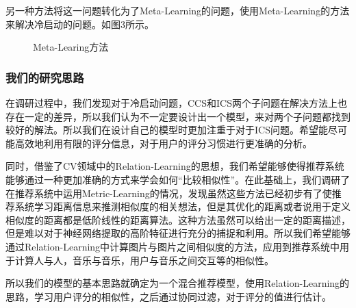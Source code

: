 另一种方法将这一问题转化为了Meta-Learning的问题，使用Meta-Learning的方法来解决冷启动的问题\cite{metalearning}。如图3所示。
\begin{figure}[htb]        
\caption{\label{3} Meta-Learing方法}      
\end{figure}

\subsubsection{我们的研究思路}
在调研过程中，我们发现对于冷启动问题，CCS和ICS两个子问题在解决方法上也存在一定的差异\cite{coldstart}，所以我们认为不一定要设计出一个模型，来对两个子问题都找到较好的解法。所以我们在设计自己的模型时更加注重于对于ICS问题。希望能尽可能高效地利用有限的评分信息，对于用户的评分习惯进行更准确的分析。

同时，借鉴了CV领域中的Relation-Learning的思想，我们希望能够使得推荐系统能够通过一种更加准确的方式来学会如何“比较相似性”。在此基础上，我们调研了在推荐系统中运用Metric-Learning的情况，发现虽然这些方法已经初步有了使推荐系统学习距离信息来推测相似度的相关想法，但是其优化的距离或者说用于定义相似度的距离都是低阶线性的距离算法。这种方法虽然可以给出一定的距离描述，但是难以对于神经网络提取的高阶特征进行充分的捕捉和利用。所以我们希望能够通过Relation-Learning中计算图片与图片之间相似度的方法，应用到推荐系统中用于计算人与人，音乐与音乐，用户与音乐之间交互等的相似性。

所以我们的模型的基本思路就确定为一个混合推荐模型，使用Relation-Learning的思路，学习用户评分的相似性，之后通过协同过滤，对于评分的值进行估计。